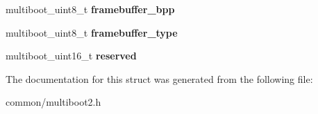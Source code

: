 \begin{DoxyCompactItemize}
\item 
multiboot\+\_\+uint8\+\_\+t {\bfseries framebuffer\+\_\+bpp}\hypertarget{structmultiboot__tag__framebuffer__common_a4564d1a0382ddb2d369d477e8d606bdc}{}\label{structmultiboot__tag__framebuffer__common_a4564d1a0382ddb2d369d477e8d606bdc}

\item 
multiboot\+\_\+uint8\+\_\+t {\bfseries framebuffer\+\_\+type}\hypertarget{structmultiboot__tag__framebuffer__common_a8e9b14e399bb744ce5c6aad3d67854a1}{}\label{structmultiboot__tag__framebuffer__common_a8e9b14e399bb744ce5c6aad3d67854a1}

\item 
multiboot\+\_\+uint16\+\_\+t {\bfseries reserved}\hypertarget{structmultiboot__tag__framebuffer__common_a7a0c949d3597c3889fa056f59d6a5cb7}{}\label{structmultiboot__tag__framebuffer__common_a7a0c949d3597c3889fa056f59d6a5cb7}

\end{DoxyCompactItemize}


The documentation for this struct was generated from the following file\+:\begin{DoxyCompactItemize}
\item 
common/multiboot2.\+h\end{DoxyCompactItemize}
